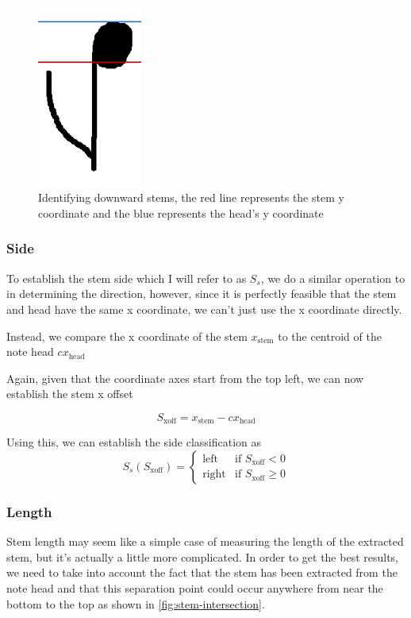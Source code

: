 \begin{figure}[h!]
    \quad
    \includegraphics[height=6cm]{gfx/techniques/scoring/note-stem-down/6090.png}

    \caption{Identifying downward stems, the red line represents the stem y  coordinate and the blue represents the head's y coordinate}
    \label{fig:downward-stem-identification}
\end{figure}

\subsubsection{Side}\label{sec:scoring-stem-side}
To establish the stem side which I will refer to as $S_s$, we do a similar operation to in determining the direction, however, since it is perfectly feasible that the stem and head have the same x coordinate, we can't just use the x coordinate directly.

Instead, we compare the x coordinate of the stem $x_{\text{stem}}$ to the centroid of the note head $cx_{\text{head}}$

Again, given that the coordinate axes start from the top left, we can now establish the stem x offset

$$
S_\text{xoff} = x_{\text{stem}} - cx_{\text{head}}
$$

Using this, we can establish the side classification as
$$
S_{s} (S_\text{xoff}) =
\left\{
    \begin{array}{ll}
        \text{left}   & \mbox{if } S_\text{xoff} < 0 \\
        \text{right}  & \mbox{if } S_\text{xoff} \ge 0
    \end{array}
\right.
$$

\subsubsection{Length}\label{sec:scoring-stem-length}

Stem length may seem like a simple case of measuring the length of the extracted stem, but it's actually a little more complicated. In order to get the best results, we need to take into account the fact that the stem has been extracted from the note head and that this separation point could occur anywhere from near the bottom to the top as shown in \cref{fig:stem-intersection}.

